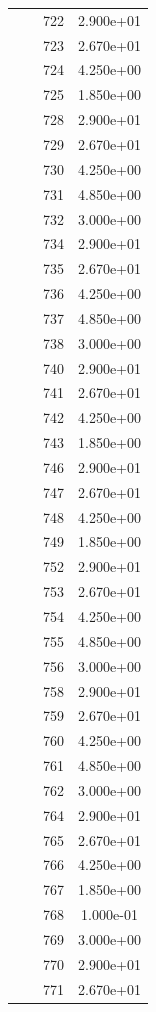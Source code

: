 \documentclass[12pt]{article}
\begin{document}
\begin{longtable}{@{}cccc@{}}
 &  & 722 & 2.900e+01 \\
 &  & 723 & 2.670e+01 \\
 &  & 724 & 4.250e+00 \\
 &  & 725 & 1.850e+00 \\
 &  & 728 & 2.900e+01 \\
 &  & 729 & 2.670e+01 \\
 &  & 730 & 4.250e+00 \\
 &  & 731 & 4.850e+00 \\
 &  & 732 & 3.000e+00 \\
 &  & 734 & 2.900e+01 \\
 &  & 735 & 2.670e+01 \\
 &  & 736 & 4.250e+00 \\
 &  & 737 & 4.850e+00 \\
 &  & 738 & 3.000e+00 \\
 &  & 740 & 2.900e+01 \\
 &  & 741 & 2.670e+01 \\
 &  & 742 & 4.250e+00 \\
 &  & 743 & 1.850e+00 \\
 &  & 746 & 2.900e+01 \\
 &  & 747 & 2.670e+01 \\
 &  & 748 & 4.250e+00 \\
 &  & 749 & 1.850e+00 \\
 &  & 752 & 2.900e+01 \\
 &  & 753 & 2.670e+01 \\
 &  & 754 & 4.250e+00 \\
 &  & 755 & 4.850e+00 \\
 &  & 756 & 3.000e+00 \\
 &  & 758 & 2.900e+01 \\
 &  & 759 & 2.670e+01 \\
 &  & 760 & 4.250e+00 \\
 &  & 761 & 4.850e+00 \\
 &  & 762 & 3.000e+00 \\
 &  & 764 & 2.900e+01 \\
 &  & 765 & 2.670e+01 \\
 &  & 766 & 4.250e+00 \\
 &  & 767 & 1.850e+00 \\
 &  & 768 & 1.000e-01 \\
 &  & 769 & 3.000e+00 \\
 &  & 770 & 2.900e+01 \\
 &  & 771 & 2.670e+01 \\

\end{longtable}
\end{document}
